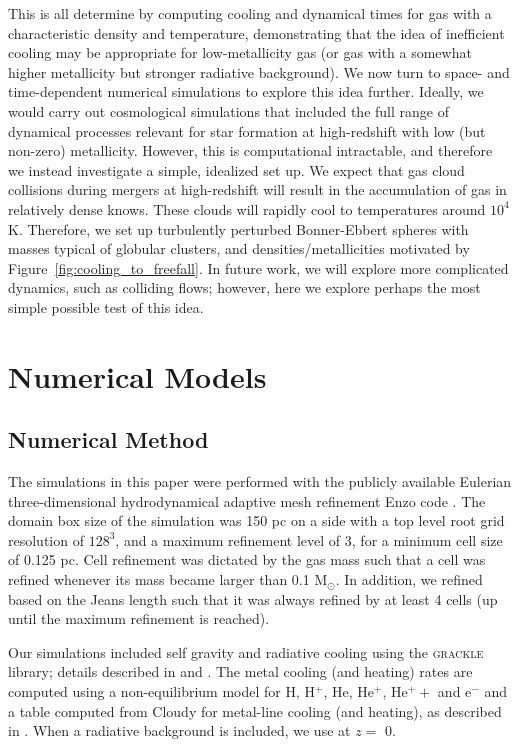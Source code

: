 \documentclass[useAMS,usenatbib]{mn2e}
\begin{document}
This is all determine by computing cooling and dynamical times for gas with a characteristic density and temperature, demonstrating that the idea of inefficient cooling may be appropriate for low-metallicity gas (or gas with a somewhat higher metallicity but stronger radiative background).   We now turn to space- and time-dependent numerical simulations to explore this idea further.  Ideally, we would carry out cosmological simulations that included the full range of dynamical processes relevant for star formation at high-redshift with low (but non-zero) metallicity.  However, this is computational intractable, and therefore we instead investigate a simple, idealized set up.  We expect that gas cloud collisions during mergers at high-redshift will result in the accumulation of gas in relatively dense knows.  These clouds will rapidly cool to temperatures around $10^4$ K.  Therefore, we set up turbulently perturbed Bonner-Ebbert spheres with masses typical of globular clusters, and densities/metallicities motivated by Figure~\ref{fig:cooling_to_freefall}.   In future work, we will explore more complicated dynamics, such as colliding flows; however, here we explore perhaps the most simple possible test of this idea.


%
\section{Numerical Models}
\label{sec:numerical}
\subsection{Numerical Method}

The simulations in this paper were performed with the publicly available Eulerian three-dimensional
hydrodynamical adaptive mesh refinement Enzo code \citep{Bryan2014}. The domain
box size of the simulation was 150 pc on a side with a top level root grid resolution of $128^3$, and
a maximum refinement level of 3, for a minimum cell size of 0.125 pc.  Cell refinement was dictated 
by the gas mass such that a cell was refined whenever its mass became larger than 0.1 M$_\odot$.
In addition, we refined based on the Jeans length such that it was always refined by at least 4 cells (up until
the maximum refinement is reached).

Our simulations included self gravity and radiative cooling using the
\textsc{grackle} library; details described in \cite{Bryan2014} and \cite{Smith2016}. The metal cooling (and
heating) rates are computed using a non-equilibrium model for H, H$^+$, He, He$^+$, He$^++$ and e$^-$
and a table computed from Cloudy for metal-line cooling (and heating), as described in \citet{Smith2016}.
When a radiative background is included, we use \cite{Haardt2012} at $z=$ 0.
\end{document}
